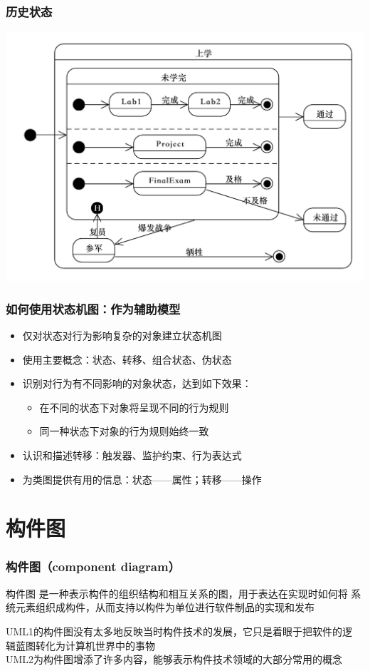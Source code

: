 \documentclass[compress]{beamer}
\begin{document}
\begin{frame}
  \frametitle{历史状态}
  \centering\includegraphics[width=1.0\hsize]{complexstate2.pdf}
\end{frame}

\begin{frame}
  \frametitle{如何使用状态机图：作为辅助模型}
  \begin{itemize}
    \item 仅对状态对行为影响复杂的对象建立状态机图
    \item 使用主要概念：状态、转移、组合状态、伪状态
    \item 识别对行为有不同影响的对象状态，达到如下效果：
      \begin{itemize}
        \item 在不同的状态下对象将呈现不同的行为规则
        \item 同一种状态下对象的行为规则始终一致
      \end{itemize}
    \item 认识和描述转移：触发器、监护约束、行为表达式
    \item 为类图提供有用的信息：状态——属性；转移——操作
  \end{itemize}

\end{frame}

\section{构件图}

\begin{frame}
  \frametitle{构件图（component diagram）}
  \begin{block}{构件图}
    是一种表示构件的组织结构和相互关系的图，用于表达在实现时如何将
    系统元素组织成构件，从而支持以构件为单位进行软件制品的实现和发布
  \end{block}

    UML1的构件图没有太多地反映当时构件技术的发展，它只是着眼于把软件的逻
    辑蓝图转化为计算机世界中的事物 \\

     UML2为构件图增添了许多内容，能够表示构件技术领域的大部分常用的概念

\end{frame}
\end{document}
